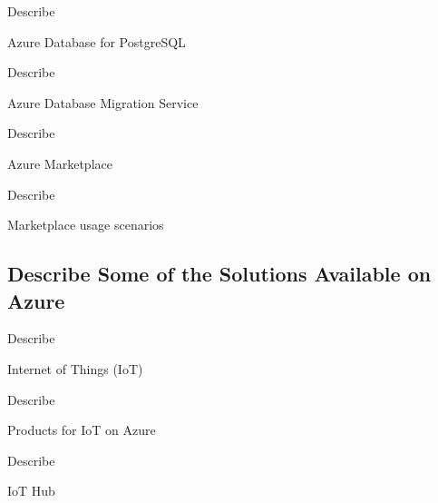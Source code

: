 \documentclass{scrartcl}
\newenvironment{flashcard}[2][]{%
    #1
    \vfill
    \centerline{\Large{#2}}
    \vfill
    \newpage
}
{\newpage}
\newcommand{\subsectioncard}[1]{
    \vspace*{\stretch{1}}
    \subsection{#1}
    \vspace*{\stretch{1}}
    \pagebreak
}
\begin{document}
    \begin{flashcard}[Describe]{Azure Database for PostgreSQL}

    \end{flashcard}

    \begin{flashcard}[Describe]{Azure Database Migration Service}

    \end{flashcard}

    \begin{flashcard}[Describe]{Azure Marketplace}

    \end{flashcard}

    \begin{flashcard}[Describe]{Marketplace usage scenarios}

    \end{flashcard}

    \subsectioncard{Describe Some of the Solutions Available on Azure}

    \begin{flashcard}[Describe]{Internet of Things (IoT)}

    \end{flashcard}

    \begin{flashcard}[Describe]{Products for IoT on Azure}

    \end{flashcard}

    \begin{flashcard}[Describe]{IoT Hub}

    \end{flashcard}
\end{document}
